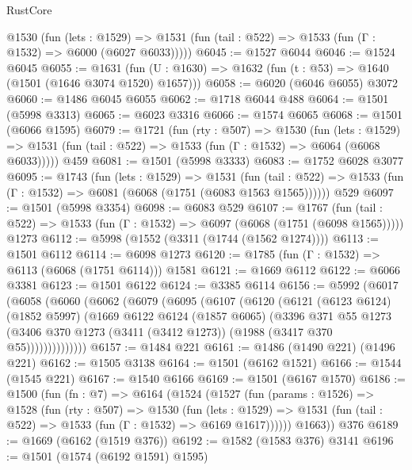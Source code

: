 \begin{lexlean}{RustCore}
\begin{coremodule}
    @1530
      (fun (lets : @1529) =>
      @1531 (fun (tail : @522) => @1533 (fun (Γ : @1532) => @6000 (@6027 @6033)))))
@6045 := @1527 @6044
@6046 := @1524 @6045
@6055 := @1631 (fun (U : @1630) => @1632 (fun (t : @53) => @1640 (@1501 (@1646 @3074 @1520) @1657)))
@6058 := @6020 (@6046 @6055) @3072
@6060 := @1486 @6045 @6055
@6062 := @1718 @6044 @488
@6064 := @1501 (@5998 @3313)
@6065 := @6023 @3316
@6066 := @1574 @6065
@6068 := @1501 (@6066 @1595)
@6079 := @1721
    (fun (rty : @507) =>
    @1530
      (fun (lets : @1529) =>
      @1531 (fun (tail : @522) => @1533 (fun (Γ : @1532) => @6064 (@6068 @6033)))))
    @459
@6081 := @1501 (@5998 @3333)
@6083 := @1752 @6028 @3077
@6095 := @1743
    (fun (lets : @1529) =>
    @1531
      (fun (tail : @522) => @1533 (fun (Γ : @1532) => @6081 (@6068 (@1751 (@6083 @1563 @1565))))))
    @529
@6097 := @1501 (@5998 @3354)
@6098 := @6083 @529
@6107 := @1767
    (fun (tail : @522) => @1533 (fun (Γ : @1532) => @6097 (@6068 (@1751 (@6098 @1565)))))
    @1273
@6112 := @5998 (@1552 (@3311 (@1744 (@1562 @1274))))
@6113 := @1501 @6112
@6114 := @6098 @1273
@6120 := @1785 (fun (Γ : @1532) => @6113 (@6068 (@1751 @6114))) @1581
@6121 := @1669 @6112
@6122 := @6066 @3381
@6123 := @1501 @6122
@6124 := @3385 @6114
@6156 := @5992
    (@6017
      (@6058
        (@6060
          (@6062
            (@6079
              (@6095
                (@6107
                  (@6120
                    (@6121
                      (@6123 @6124)
                      (@1852 @5997)
                      (@1669
                        @6122
                        @6124
                        (@1857 @6065)
                        (@3396
                          @371
                          @55
                          @1273
                          (@3406
                            @370
                            @1273
                            (@3411 (@3412 @1273))
                            (@1988 (@3417 @370 @55))))))))))))))
@6157 := @1484 @221
@6161 := @1486 (@1490 @221) (@1496 @221)
@6162 := @1505 @3138
@6164 := @1501 (@6162 @1521)
@6166 := @1544 (@1545 @221)
@6167 := @1540 @6166
@6169 := @1501 (@6167 @1570)
@6186 := @1500
    (fun (fn : @7) =>
    @6164
      (@1524
        (@1527
          (fun (params : @1526) =>
          @1528
            (fun (rty : @507) =>
            @1530
              (fun (lets : @1529) =>
              @1531 (fun (tail : @522) => @1533 (fun (Γ : @1532) => @6169 @1617))))))
        @1663))
    @376
@6189 := @1669 (@6162 (@1519 @376))
@6192 := @1582 (@1583 @376) @3141
@6196 := @1501 (@1574 (@6192 @1591) @1595)

\end{coremodule}
\end{lexlean}
